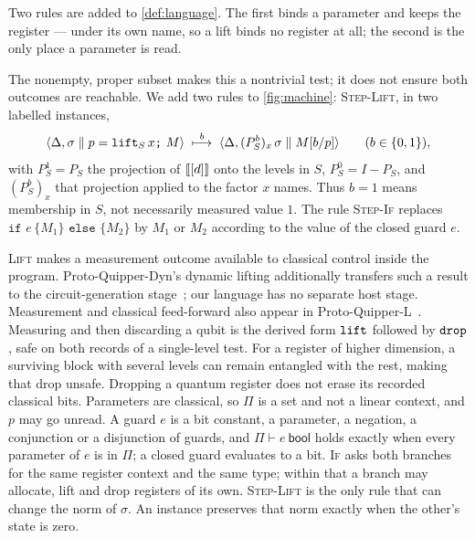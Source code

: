 \documentclass[acmsmall,screen,review,anonymous,nonacm]{acmart}
\begin{document}
Two rules are added to \cref{def:language}. The first binds a parameter and keeps
the register --- under its own name, so a lift binds no register at all; the
second is the only place a parameter is read.
The nonempty, proper subset makes this a nontrivial test; it does not
ensure both outcomes are reachable. We add
two rules to \cref{fig:machine}: \textsc{Step-Lift}, in two labelled instances,
\[
  \langle \Delta, \sigma \parallel p = \texttt{lift}_S\,x\texttt{;}\ M\rangle
  \;\overset{b}{\longmapsto}\;
  \langle \Delta, (P^{b}_S)_x\,\sigma \parallel M[b/p]\rangle
  \qquad (b \in \{0,1\}),
\]
with $P^{1}_S = P_S$ the projection of $[\![[d]]\!]$ onto the levels in $S$,
$P^{0}_S = I - P_S$, and $(P^{b}_S)_x$ that projection applied to the factor $x$
names. Thus $b=1$ means membership in $S$, not necessarily measured value $1$.
The rule \textsc{Step-If} replaces
$\texttt{if } e\,\{M_1\}\texttt{ else }\{M_2\}$ by $M_1$ or $M_2$ according to the
value of the closed guard $e$.

\textsc{Lift} makes a measurement outcome available to classical control
inside the program. Proto-Quipper-Dyn's dynamic lifting additionally
transfers such a result to the circuit-generation stage~\cite{Fu2023DynamicLifting};
our language has no separate host stage. Measurement and classical
feed-forward also appear in Proto-Quipper-L~\cite{Lee2021ProtoQuipperL}.
Measuring and then discarding a qubit is the derived form $\texttt{lift}$ followed
by $\texttt{drop}$, safe on both records of a single-level test. For a register of
higher dimension, a surviving block with several levels can remain
entangled with the rest, making that drop unsafe.
Dropping a quantum register does not erase its recorded classical bits.
Parameters are classical, so $\Pi$ is a set and not a linear context, and $p$ may
go unread. A guard $e$ is a bit constant, a parameter, a negation, a
conjunction or a disjunction of guards, and $\Pi \vdash e\ \mathsf{bool}$ holds
exactly when every parameter of $e$ is in $\Pi$; a closed guard evaluates to a
bit. \textsc{If} asks both branches for the same register context and the same
type; within that a branch may allocate, lift and drop registers of its own.
\textsc{Step-Lift} is the only rule that can change the norm
of $\sigma$. An instance preserves that norm exactly when the other's
state is zero.
\end{document}
